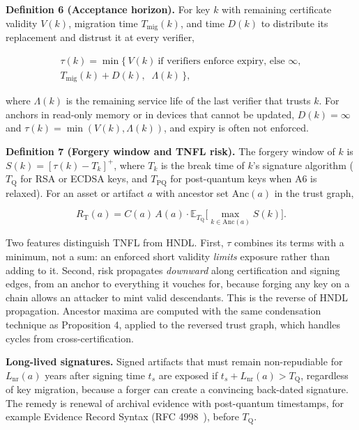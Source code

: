 \documentclass[conference]{IEEEtran}
\newcommand{\Tq}{T_{\mathrm{Q}}}
\providecommand{\E}{}\renewcommand{\E}{\mathbb{E}}
\newcommand{\pos}[1]{\left[#1\right]^{+}}
\providecommand{\gt}{}\renewcommand{\gt}{>}
\newenvironment{envblock}{\par\smallskip\noindent\ignorespaces}{\par\smallskip}
\begin{document}
\begin{envblock}

\textbf{Definition 6 (Acceptance horizon).} For key $k$ with remaining certificate validity $V(k)$, migration time $T_{\mathrm{mig}}(k)$, and time $D(k)$ to distribute its replacement and distrust it at every verifier,

\begin{multline*}
\tau(k) = \min\big\{\, V(k)\ \text{if verifiers enforce expiry, else } \infty, \\
 T_{\mathrm{mig}}(k) + D(k),\;\; \Lambda(k) \,\big\},
\end{multline*}

where $\Lambda(k)$ is the remaining service life of the last verifier that trusts $k$. For anchors in read-only memory or in devices that cannot be updated, $D(k) = \infty$ and $\tau(k) = \min(V(k), \Lambda(k))$, and expiry is often not enforced.

\textbf{Definition 7 (Forgery window and TNFL risk).} The forgery window of $k$ is $S(k) = \pos{\tau(k) - T_k}$, where $T_k$ is the break time of $k$'s signature algorithm ($\Tq$ for RSA or ECDSA keys, and $T_{\mathrm{PQ}}$ for post-quantum keys when A6 is relaxed). For an asset or artifact $a$ with ancestor set $\mathrm{Anc}(a)$ in the trust graph,

\[ R_{\mathrm{T}}(a) = C(a)\, A(a)\cdot \E_{\Tq}\Big[\max_{k \in \mathrm{Anc}(a)} S(k)\Big]. \]
\end{envblock}

Two features distinguish TNFL from HNDL. First, $\tau$ combines its terms with a minimum, not a sum: an enforced short validity \emph{limits} exposure rather than adding to it. Second, risk propagates \emph{downward} along certification and signing edges, from an anchor to everything it vouches for, because forging any key on a chain allows an attacker to mint valid descendants. This is the reverse of HNDL propagation. Ancestor maxima are computed with the same condensation technique as Proposition 4, applied to the reversed trust graph, which handles cycles from cross-certification.

\textbf{Long-lived signatures.} Signed artifacts that must remain non-repudiable for $L_{\mathrm{nr}}(a)$ years after signing time $t_s$ are exposed if $t_s + L_{\mathrm{nr}}(a) \gt \Tq$, regardless of key migration, because a forger can create a convincing back-dated signature. The remedy is renewal of archival evidence with post-quantum timestamps, for example Evidence Record Syntax (RFC 4998~\cite{gondrom2007}), before $\Tq$.
\end{document}

